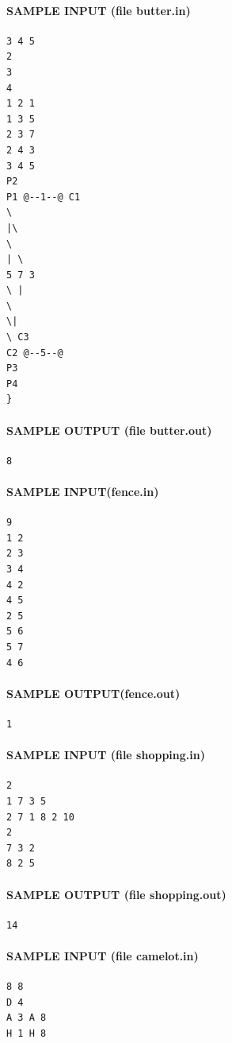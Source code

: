 \documentclass[11pt]{article}
\begin{document}
\paragraph{SAMPLE INPUT (file butter.in)}
\begin{verbatim}
3 4 5
2
3
4
1 2 1
1 3 5
2 3 7
2 4 3
3 4 5
P2
P1 @--1--@ C1
\
|\
\
| \
5 7 3
\ |
\
\|
\ C3
C2 @--5--@
P3
P4
}
\end{verbatim}

\paragraph{SAMPLE OUTPUT (file butter.out)}
\begin{verbatim}
8
\end{verbatim}

\paragraph{SAMPLE INPUT(fence.in)}
\begin{verbatim}
9
1 2
2 3
3 4
4 2
4 5
2 5
5 6
5 7
4 6
\end{verbatim}

\paragraph{SAMPLE OUTPUT(fence.out)}
\begin{verbatim}
1
\end{verbatim}

\paragraph{SAMPLE INPUT (file shopping.in)}
\begin{verbatim}
2
1 7 3 5
2 7 1 8 2 10
2
7 3 2
8 2 5
\end{verbatim}

\paragraph{SAMPLE OUTPUT (file shopping.out)}
\begin{verbatim}
14
\end{verbatim}

\paragraph{SAMPLE INPUT (file camelot.in)}
\begin{verbatim}
8 8
D 4
A 3 A 8
H 1 H 8
\end{verbatim}
\end{document}
